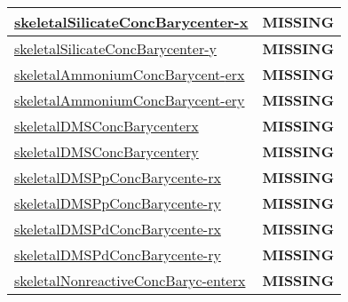 {\begin{center}
\begin{longtable}{| p{2.0in} | p{4.0in} |}
    \hline
    \hyperref[subsec:var_sec_tracer_barycenter_skeletalSilicateConcBarycenterx]{skeletalSilicateConcBarycenter-}\hyperref[subsec:var_sec_tracer_barycenter_skeletalSilicateConcBarycenterx]{x  }& {\bf \color{red} MISSING} \\
    \hline
    \hyperref[subsec:var_sec_tracer_barycenter_skeletalSilicateConcBarycentery]{skeletalSilicateConcBarycenter-}\hyperref[subsec:var_sec_tracer_barycenter_skeletalSilicateConcBarycentery]{y  }& {\bf \color{red} MISSING} \\
    \hline
    \hyperref[subsec:var_sec_tracer_barycenter_skeletalAmmoniumConcBarycenterx]{skeletalAmmoniumConcBarycent-}\hyperref[subsec:var_sec_tracer_barycenter_skeletalAmmoniumConcBarycenterx]{erx  }& {\bf \color{red} MISSING} \\
    \hline
    \hyperref[subsec:var_sec_tracer_barycenter_skeletalAmmoniumConcBarycentery]{skeletalAmmoniumConcBarycent-}\hyperref[subsec:var_sec_tracer_barycenter_skeletalAmmoniumConcBarycentery]{ery  }& {\bf \color{red} MISSING} \\
    \hline
    \hyperref[subsec:var_sec_tracer_barycenter_skeletalDMSConcBarycenterx]{skeletalDMSConcBarycenterx} & {\bf \color{red} MISSING} \\
    \hline
    \hyperref[subsec:var_sec_tracer_barycenter_skeletalDMSConcBarycentery]{skeletalDMSConcBarycentery} & {\bf \color{red} MISSING} \\
    \hline
    \hyperref[subsec:var_sec_tracer_barycenter_skeletalDMSPpConcBarycenterx]{skeletalDMSPpConcBarycente-}\hyperref[subsec:var_sec_tracer_barycenter_skeletalDMSPpConcBarycenterx]{rx  }& {\bf \color{red} MISSING} \\
    \hline
    \hyperref[subsec:var_sec_tracer_barycenter_skeletalDMSPpConcBarycentery]{skeletalDMSPpConcBarycente-}\hyperref[subsec:var_sec_tracer_barycenter_skeletalDMSPpConcBarycentery]{ry  }& {\bf \color{red} MISSING} \\
    \hline
    \hyperref[subsec:var_sec_tracer_barycenter_skeletalDMSPdConcBarycenterx]{skeletalDMSPdConcBarycente-}\hyperref[subsec:var_sec_tracer_barycenter_skeletalDMSPdConcBarycenterx]{rx  }& {\bf \color{red} MISSING} \\
    \hline
    \hyperref[subsec:var_sec_tracer_barycenter_skeletalDMSPdConcBarycentery]{skeletalDMSPdConcBarycente-}\hyperref[subsec:var_sec_tracer_barycenter_skeletalDMSPdConcBarycentery]{ry  }& {\bf \color{red} MISSING} \\
    \hline
    \hyperref[subsec:var_sec_tracer_barycenter_skeletalNonreactiveConcBarycenterx]{skeletalNonreactiveConcBaryc-}\hyperref[subsec:var_sec_tracer_barycenter_skeletalNonreactiveConcBarycenterx]{enterx  }& {\bf \color{red} MISSING} \\

\end{longtable}
\end{center}}
